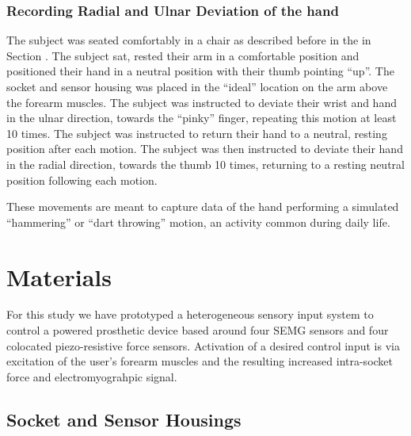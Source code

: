 \documentclass[twocolumn]{sagej}
\begin{document}
\subsubsection*{Recording Radial and Ulnar Deviation of the hand}
\label{sec:exp_prot-hammer}

The subject was seated comfortably in a chair as described before in the in Section \textit{}.  The subject sat, rested their arm in a comfortable position and positioned their hand in a neutral position with their thumb pointing ``up''.  The socket and sensor housing was placed in the ``ideal'' location on the arm above the forearm muscles.  The subject was instructed to deviate their wrist and hand in the ulnar direction, towards the ``pinky'' finger, repeating this motion at least 10 times.  The subject was instructed to return their hand to a neutral, resting position after each motion.  The subject was then instructed to deviate their hand in the radial direction, towards the thumb 10 times, returning to a resting neutral position following each motion.  \par \noindent
These movements are meant to capture data of the hand performing a simulated ``hammering'' or ``dart throwing'' motion, an activity common during daily life.


\section*{Materials} 
\label{sec:materials}

For this study we have prototyped a heterogeneous sensory input system to control a powered prosthetic device based around four SEMG sensors and four colocated piezo-resistive force sensors.  Activation of a desired control input is via excitation of the user's forearm muscles and the resulting increased intra-socket force and electromyograhpic signal. 

\subsection*{Socket and Sensor Housings}
\label{sec:socket}
\end{document}
